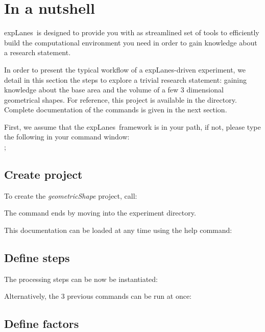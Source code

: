 \documentclass[a4paper,fleqn]{tufte-handout}
\newcommand{\explanes}{\textsf{expLanes}\ }
\begin{document}
\section{In a nutshell}
\hypertarget{nutshell}{}
 
\explanes is designed to provide you with as streamlined set of tools to efficiently build the computational environment you need in order to gain knowledge about a research statement.

In order to present the typical workflow of a \textsf{expLanes}-driven experiment, we detail in this section the steps to explore a trivial research statement: gaining knowledge about the base area and the volume of a few 3 dimensional geometrical shapes. For reference, this project is available in the  directory. Complete documentation of the commands is given in the next section.%

First, we assume that the \explanes framework is in your path, if not, please type the following in your command window: \\ ;

\subsection{Create project}

To create the \textsl{geometricShape} project, call:


The command ends by moving into the experiment directory.

This documentation can be loaded at any time using the help command:



\subsection{Define steps}

The processing steps can be now be instantiated:



\noindent
Alternatively, the  3 previous commands can be run at once: \\


\subsection{Define factors}
\end{document}
